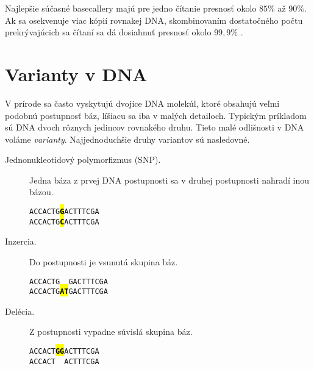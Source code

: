 Najlepšie súčasné basecallery majú pre jedno čítanie presnosť okolo $85\%$ až $90\%$. Ak sa osekvenuje viac kópií rovnakej DNA, skombinovaním dostatočného počtu prekrývajúcich sa čítaní sa dá dosiahnuť presnosť okolo $99,9\%$ \cite{BasecallerComparison}.

\section{Varianty v DNA}

V prírode sa často vyskytujú dvojice DNA molekúl, ktoré obsahujú veľmi podobnú postupnosť báz, líšiacu sa iba v malých detailoch. Typickým príkladom sú DNA dvoch rôznych jedincov rovnakého druhu. Tieto malé odlišnosti v DNA voláme \emph{varianty}. Najjednoduchšie druhy variantov sú nasledovné.

\begin{description}
\item [Jednonukleotidový polymorfizmus (SNP\footnotemark).] Jedna báza z prvej DNA postupnosti sa v druhej postupnosti nahradí inou bázou.

\begin{center}
\texttt{ACCACTG\textbf{\hl{G}}ACTTTCGA \\
ACCACTG\textbf{\hl{C}}ACTTTCGA
}
\end{center}

\item [Inzercia.] Do postupnosti je vsunutá skupina báz.

\begin{center}
\texttt{ACCACTG\hl{ }GACTTTCGA \\
ACCACTG\textbf{\hl{AT}}GACTTTCGA
}
\end{center}

\item [Delécia.] Z postupnosti vypadne súvislá skupina báz.

\begin{center}
\texttt{ACCACT\textbf{\hl{GG}}ACTTTCGA \\
ACCACT\hl{ }ACTTTCGA
}
\end{center}


\end{description}